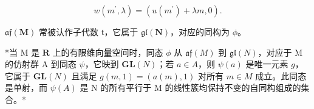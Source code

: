 \[
w (m ^ {\prime}, \lambda) = (u (m ^ {\prime}) + \lambda m, 0).
\]

\(\mathfrak{af}(\mathbf{M})\) 常被认作子代数 \(\mathfrak{t}\)，它属于 \(\mathfrak{gl}(\mathbf{N})\)，对应的同构为 \(\phi\)。

*当 M 是 \(\mathbf{R}\) 上的有限维向量空间时，同态 \(\phi\) 从 \(\mathfrak{af}(M)\) 到 \(\mathfrak{gl}(N)\)，对应于 M 的仿射群 A 到同态 \(\psi\)，它映到 \(\mathbf{GL}(N)\)；若 \(a \in A\)，则 \(\psi(a)\) 是唯一元素 \(g\)，它属于 \(\mathbf{GL}(N)\) 且满足 \(g(m, 1) = (a(m), 1)\) 对所有 \(m \in M\) 成立。此同态是单射，而 \(\psi(A)\) 是 N 的所有平行于 M 的线性簇均保持不变的自同构组成的集合。*

